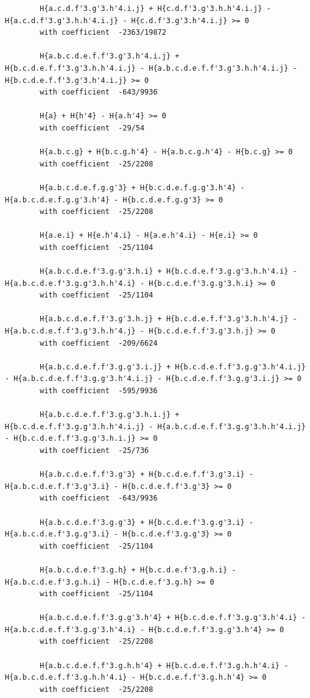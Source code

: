\documentclass[11pt, a4paper]{kybernetika}
\begin{document}
\begin{verbatim}
		H{a.c.d.f'3.g'3.h'4.i.j} + H{c.d.f'3.g'3.h.h'4.i.j} - H{a.c.d.f'3.g'3.h.h'4.i.j} - H{c.d.f'3.g'3.h'4.i.j} >= 0
		with coefficient  -2363/19872
		
		H{a.b.c.d.e.f.f'3.g'3.h'4.i.j} + H{b.c.d.e.f.f'3.g'3.h.h'4.i.j} - H{a.b.c.d.e.f.f'3.g'3.h.h'4.i.j} - H{b.c.d.e.f.f'3.g'3.h'4.i.j} >= 0
		with coefficient  -643/9936
		
		H{a} + H{h'4} - H{a.h'4} >= 0
		with coefficient  -29/54
		
		H{a.b.c.g} + H{b.c.g.h'4} - H{a.b.c.g.h'4} - H{b.c.g} >= 0
		with coefficient  -25/2208
		
		H{a.b.c.d.e.f.g.g'3} + H{b.c.d.e.f.g.g'3.h'4} - H{a.b.c.d.e.f.g.g'3.h'4} - H{b.c.d.e.f.g.g'3} >= 0
		with coefficient  -25/2208
		
		H{a.e.i} + H{e.h'4.i} - H{a.e.h'4.i} - H{e.i} >= 0
		with coefficient  -25/1104
		
		H{a.b.c.d.e.f'3.g.g'3.h.i} + H{b.c.d.e.f'3.g.g'3.h.h'4.i} - H{a.b.c.d.e.f'3.g.g'3.h.h'4.i} - H{b.c.d.e.f'3.g.g'3.h.i} >= 0
		with coefficient  -25/1104
		
		H{a.b.c.d.e.f.f'3.g'3.h.j} + H{b.c.d.e.f.f'3.g'3.h.h'4.j} - H{a.b.c.d.e.f.f'3.g'3.h.h'4.j} - H{b.c.d.e.f.f'3.g'3.h.j} >= 0
		with coefficient  -209/6624
		
		H{a.b.c.d.e.f.f'3.g.g'3.i.j} + H{b.c.d.e.f.f'3.g.g'3.h'4.i.j} - H{a.b.c.d.e.f.f'3.g.g'3.h'4.i.j} - H{b.c.d.e.f.f'3.g.g'3.i.j} >= 0
		with coefficient  -595/9936
		
		H{a.b.c.d.e.f.f'3.g.g'3.h.i.j} + H{b.c.d.e.f.f'3.g.g'3.h.h'4.i.j} - H{a.b.c.d.e.f.f'3.g.g'3.h.h'4.i.j} - H{b.c.d.e.f.f'3.g.g'3.h.i.j} >= 0
		with coefficient  -25/736
		
		H{a.b.c.d.e.f.f'3.g'3} + H{b.c.d.e.f.f'3.g'3.i} - H{a.b.c.d.e.f.f'3.g'3.i} - H{b.c.d.e.f.f'3.g'3} >= 0
		with coefficient  -643/9936
		
		H{a.b.c.d.e.f'3.g.g'3} + H{b.c.d.e.f'3.g.g'3.i} - H{a.b.c.d.e.f'3.g.g'3.i} - H{b.c.d.e.f'3.g.g'3} >= 0
		with coefficient  -25/1104
		
		H{a.b.c.d.e.f'3.g.h} + H{b.c.d.e.f'3.g.h.i} - H{a.b.c.d.e.f'3.g.h.i} - H{b.c.d.e.f'3.g.h} >= 0
		with coefficient  -25/1104
		
		H{a.b.c.d.e.f.f'3.g.g'3.h'4} + H{b.c.d.e.f.f'3.g.g'3.h'4.i} - H{a.b.c.d.e.f.f'3.g.g'3.h'4.i} - H{b.c.d.e.f.f'3.g.g'3.h'4} >= 0
		with coefficient  -25/2208
		
		H{a.b.c.d.e.f.f'3.g.h.h'4} + H{b.c.d.e.f.f'3.g.h.h'4.i} - H{a.b.c.d.e.f.f'3.g.h.h'4.i} - H{b.c.d.e.f.f'3.g.h.h'4} >= 0
		with coefficient  -25/2208
		

\end{verbatim}
\end{document}

